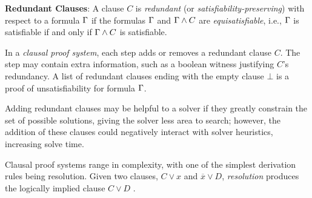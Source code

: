 \textbf{Redundant Clauses}: A clause $C$ is \emph{redundant} (or
\emph{satisfiability-preserving}) with respect to a formula $\Gamma$ if the
formulas $\Gamma$ and $\Gamma \land C$ are \emph{equisatisfiable}, i.e.,
$\Gamma$ is satisfiable if and only if $\Gamma \land C$ is satisfiable.

In a \emph{clausal proof system}, each step adds or removes a redundant clause
$C$. The step may contain extra information, such as a boolean witness
justifying $C$'s redundancy. A list of redundant clauses ending with the empty
clause $\bot$ is a proof of unsatisfiability for formula $\Gamma$.


Adding redundant clauses may be helpful to a solver if they greatly constrain
the set of possible solutions, giving the solver less area to search; however,
the addition of these clauses could negatively interact with solver heuristics,
increasing solve time.


Clausal proof systems range in complexity, with one of the simplest derivation
rules being resolution. Given two clauses, $C \lor x$ and $\overline{x} \lor D$,
\emph{resolution} produces the logically implied clause  $C \lor D$ .


